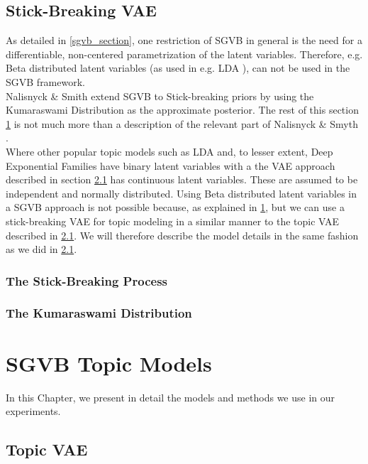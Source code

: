 \documentclass{report}
\begin{document}
\section{Stick-Breaking VAE}\label{sbvae_section}
As detailed in \ref{sgvb_section}, one restriction of SGVB in general is the need for a differentiable, non-centered parametrization of the latent variables. Therefore, e.g. Beta distributed latent variables (as used in e.g. LDA \cite{bleil2003latent}), can not be used in the SGVB framework. \\ Nalisnyck \& Smith extend SGVB to Stick-breaking priors by using the Kumaraswami Distribution as the approximate posterior. The rest of this section \ref{sbvae_section} is not much more than a description of the relevant part of Nalisnyck \& Smyth \cite{nalisnick2016deep}.\\
Where other popular topic models such as LDA \cite{blei2003latent} and, to lesser extent, Deep Exponential Families \cite{ranganath2015deep} have binary latent variables with a the VAE approach described in section \ref{TopicVAE} has continuous latent variables. These are assumed to be independent and normally distributed. Using Beta distributed latent variables in a SGVB approach is not possible because, as explained in \ref{sbvae_section}, but we can use a stick-breaking VAE for topic modeling in a similar manner to the topic VAE described in \ref{TopicVAE}. We will therefore describe the model details in the same fashion as we did in \ref{TopicVAE}. \\

\subsection{The Stick-Breaking Process}\label{sb_process}

\subsection{The Kumaraswami Distribution}\label{kum}

\chapter{SGVB Topic Models}
In this Chapter, we present in detail the models and methods we use in our experiments. 

\section{Topic VAE}\label{TopicVAE}
\end{document}
